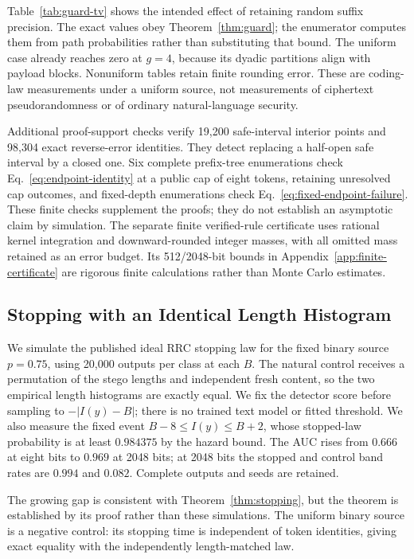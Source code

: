 Table~\ref{tab:guard-tv} shows the intended effect of retaining random suffix
precision. The exact values obey Theorem~\ref{thm:guard}; the enumerator computes
them from path probabilities rather than substituting that bound. The uniform
case already reaches zero at $g=4$, because its dyadic partitions align with
payload blocks. Nonuniform tables retain finite rounding error. These are
coding-law measurements under a uniform source, not measurements of ciphertext
pseudorandomness or of ordinary natural-language security.

Additional proof-support checks verify 19,200 safe-interval interior points
and 98,304 exact reverse-error identities. They detect replacing a half-open
safe interval by a closed one. Six complete prefix-tree enumerations check
Eq.~\eqref{eq:endpoint-identity} at a public cap of eight tokens, retaining
unresolved cap outcomes, and fixed-depth enumerations check
Eq.~\eqref{eq:fixed-endpoint-failure}. These finite checks supplement the
proofs; they do not establish an asymptotic claim by simulation.
The separate finite verified-rule certificate uses rational kernel integration
and downward-rounded integer masses, with all omitted mass retained as an
error budget. Its 512/2048-bit bounds in Appendix~\ref{app:finite-certificate}
are rigorous finite calculations rather than Monte Carlo estimates.

\subsection{Stopping with an Identical Length Histogram}

We simulate the published ideal RRC stopping law for the fixed binary source
$p=0.75$, using 20,000 outputs per class at each $B$. The natural control receives
a permutation of the stego lengths and independent fresh content, so the two
empirical length histograms are exactly equal. We fix the detector score before
sampling to $-|I(y)-B|$; there is no trained text model or fitted threshold.
We also measure the fixed event
$B-8\le I(y)\le B+2$, whose stopped-law probability is at least $0.984375$ by
the hazard bound. The AUC rises from $0.666$ at eight bits to $0.969$ at 2048 bits; at 2048 bits the stopped and control band rates are $0.994$ and $0.082$. Complete outputs and seeds are retained.



The growing gap is consistent with Theorem~\ref{thm:stopping}, but the theorem
is established by its proof rather than these simulations. The uniform binary
source is a negative control: its stopping time is independent of token
identities, giving exact equality with the independently length-matched law.


